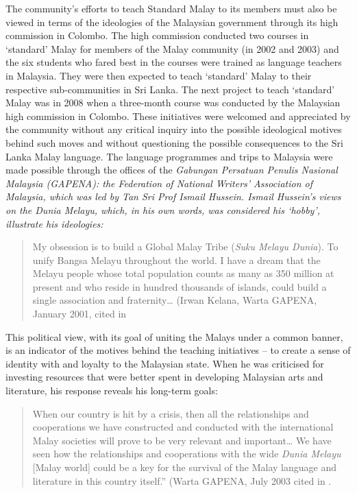 The community's efforts to teach Standard Malay to its members must also be viewed in terms of the ideologies of the Malaysian government through its high commission in Colombo. The high commission conducted two courses in `standard' Malay for members of the Malay community (in 2002 and 2003) and the six students who fared best in the courses were trained as language teachers in Malaysia. They were then expected to teach `standard' Malay to their respective sub-communities in Sri Lanka. The next project to teach `standard' Malay was in 2008 when a three-month course was conducted by the Malaysian high commission in Colombo. These initiatives were welcomed and appreciated by the community without any critical inquiry into the possible ideological motives behind such moves and without questioning the possible consequences to the Sri Lanka Malay language. The language programmes and trips to Malaysia were made possible through the offices of the \em Gabungan Persatuan Penulis Nasional Malaysia \em (GAPENA): the Federation of National Writers' Association of Malaysia, which was led by Tan Sri Prof Ismail Hussein. Ismail Hussein's views on the \textit{Dunia Melayu}, which, in his own words, was considered his `hobby', illustrate his ideologies:

\begin{quote}
My obsession is to build a Global Malay Tribe (\textit{Suku Melayu Dunia}). To unify Bangsa Melayu throughout the world. I have a dream that the Melayu people whose total population counts as many as 350 million at present and who reside in hundred thousands of islands, could build a single association and fraternity{\dots} (Irwan Kelana, Warta GAPENA, January 2001, cited in \citet[34-35]{Hisao2010}
\end{quote}


 This political view, with its goal of uniting the Malays under a common banner, is an indicator of the motives behind the teaching initiatives -- to create a sense of identity with and loyalty to the Malaysian state. When he was criticised for investing resources that were better spent in developing Malaysian arts and literature, his response reveals his long-term goals: 

\begin{quote}
When our country is hit by a crisis, then all the relationships and cooperations we have constructed and conducted with the international Malay societies will prove to be very relevant and important{\dots} We have seen how the relationships and cooperations with the wide \textit{Dunia Melayu} [Malay world] could be a key for the survival of the Malay language and literature in this country itself.'' (Warta GAPENA, July 2003 cited in \citet[34]{Hisao2010}.
\end{quote}

